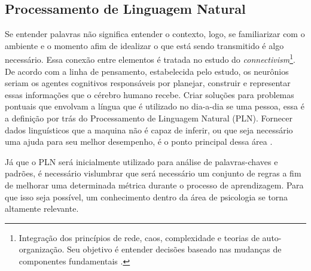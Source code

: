 \subsection{Processamento de Linguagem Natural}
Se entender palavras não significa entender o contexto, logo, se familiarizar com o ambiente e o momento afim de idealizar o que está sendo transmitido é algo necessário. Essa conexão entre elementos é tratada no estudo do \textit{connectivism}\footnote{Integração dos princípios de rede, caos, complexidade e teorias de auto-organização. Seu objetivo é entender decisões baseado nas mudanças de componentes fundamentais \cite{siemens2014connectivism}.}. De acordo com a linha de pensamento, estabelecida pelo estudo, os neurônios seriam os agentes cognitivos responsáveis por planejar, construir e representar essas informações que o cérebro humano recebe. Criar soluções para problemas pontuais que envolvam a língua que é utilizado no dia-a-dia se uma pessoa, essa é a definição por trás do Processamento de Linguagem Natural (PLN). Fornecer dados linguísticos que a maquina não é capaz de inferir, ou que seja necessário uma ajuda para seu melhor desempenho, é o ponto principal dessa área \cite{brandura1996, maria2015npl}.

Já que o PLN será inicialmente utilizado para análise de palavras-chaves e padrões, é necessário vislumbrar que será necessário um conjunto de regras a fim de melhorar uma determinada métrica durante o processo de aprendizagem. Para que isso seja possível, um conhecimento dentro da área de psicologia se torna altamente relevante.
